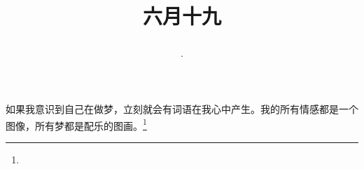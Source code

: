 \title{\date[d=24,m=7,y=2024][year:cn-y,年,month:cn,day:cn,日,·,weekday]·六月十九 }
如果我意识到自己在做梦，立刻就会有词语在我心中产生。我的所有情感都是一个图像，所有梦都是配乐的图画。\footnote{ }

